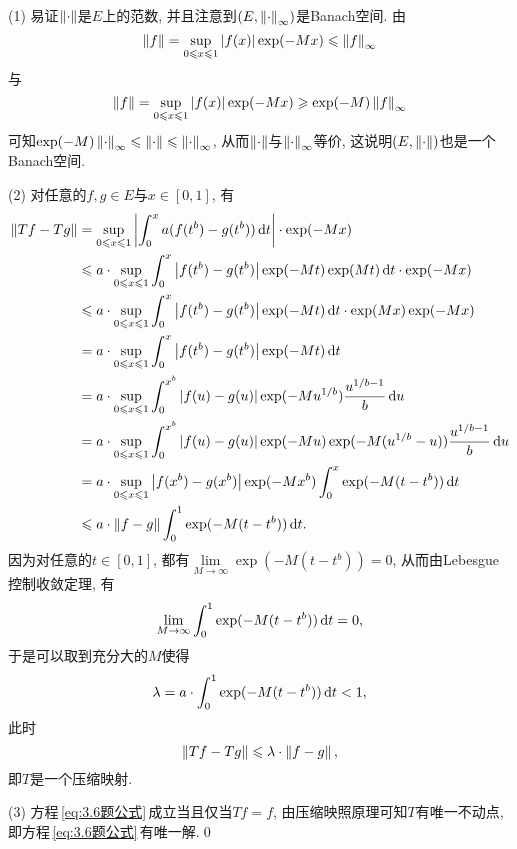     \begin{Proof}
    (1) 易证$ \left\| \cdot \right\| $是$ E $上的范数, 并且注意到$ (E,\left\| \cdot \right\|_\infty) $是Banach空间. 由
    \[
    \left\| f \right\|=\sup_{0\leqslant x\leqslant 1}\left| f(x) \right| \exp(-Mx)\leqslant\left\| f \right\|_\infty
    \]
    与
    \[
    \left\| f \right\|=\sup_{0\leqslant x\leqslant 1}\left| f(x) \right| \exp(-Mx)\geqslant\exp(-M)\left\| f \right\|_\infty
    \]
    可知$ \exp(-M)\left\| \cdot \right\|_\infty\leqslant\left\| \cdot \right\|\leqslant\left\| \cdot \right\|_\infty $, 从而$ \left\| \cdot \right\| $与$ \left\| \cdot \right\|_\infty $等价, 这说明$ (E,\left\| \cdot \right\|) $也是一个Banach空间.

    (2) 对任意的$ f, g\in E $与$ x\in[0,1] $, 有
    \[
    \begin{aligned}
    \left\| Tf-Tg \right\| & =\sup_{0\leqslant x\leqslant 1}\left| \int_0^xa(f(t^b)-g(t^b))\,\mathrm{d} t \right| \cdot\exp(-Mx) \\
    & \leqslant a\cdot\sup_{0\leqslant x\leqslant 1}\int_0^x\left| f(t^b)-g(t^b) \right| \exp(-Mt)\exp(Mt)\,\mathrm{d} t\cdot\exp(-Mx) \\
    & \leqslant a\cdot\sup_{0\leqslant x\leqslant 1}\int_0^x\left| f(t^b)-g(t^b) \right| \exp(-Mt)\,\mathrm{d} t\cdot\exp(Mx)\exp(-Mx) \\
    & =a\cdot\sup_{0\leqslant x\leqslant 1}\int_0^x\left| f(t^b)-g(t^b) \right| \exp(-Mt)\,\mathrm{d} t\\
    & =a\cdot\sup_{0\leqslant x\leqslant 1}\int_0^{x^b}\left| f(u)-g(u) \right| \exp(-Mu^{1/b})\frac{u^{1/b-1}}{b}\,\mathrm{d} u\\
    & =a\cdot\sup_{0\leqslant x\leqslant 1}\int_0^{x^b}\left| f(u)-g(u) \right| \exp(-Mu)\exp(-M(u^{1/b}-u))\frac{u^{1/b-1}}{b}\,\mathrm{d} u\\
    & =a\cdot\sup_{0\leqslant x\leqslant 1}\left| f(x^b)-g(x^b) \right| \exp(-Mx^b)\int_0^x\exp(-M(t-t^b))\,\mathrm{d} t\\
    & \leqslant a\cdot\left\| f-g \right\|\int_0^1\exp(-M(t-t^b))\,\mathrm{d} t.
    \end{aligned}
    \]
    因为对任意的$ t\in[0,1] $, 都有$ \lim\limits_{M\to\infty}\exp(-M(t-t^b))=0 $, 从而由Lebesgue控制收敛定理, 有
    \[
    \lim_{M\to\infty}\int_0^1\exp(-M(t-t^b))\,\mathrm{d} t=0,
    \]
    于是可以取到充分大的$ M $使得
    \[
    \lambda=a\cdot\int_0^1\exp(-M(t-t^b))\,\mathrm{d} t<1,
    \]
    此时
    \[
    \left\| Tf-Tg \right\|\leqslant\lambda\cdot\left\| f-g \right\|,
    \]
    即$ T $是一个压缩映射.

    (3) 方程\,\eqref{eq:3.6题公式}\,成立当且仅当$ Tf=f $, 由压缩映照原理可知$ T $有唯一不动点, 即方程\,\eqref{eq:3.6题公式}\,有唯一解.\qed
    \end{Proof}

